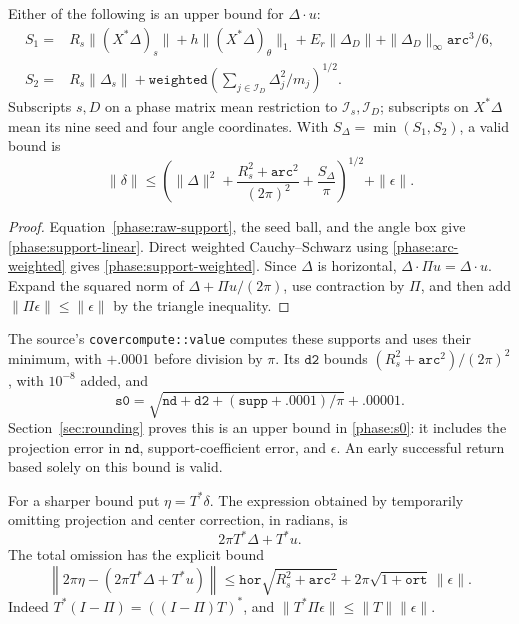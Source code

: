 \begin{lemma}
\label{phase:direct-bound}
Either of the following is an upper bound for \(\Delta\cdot u\):
\begin{align}
 S_1={}&R_s\|(X^*\Delta)_s\|
          +h\|(X^*\Delta)_\theta\|_1
          +E_r\|\Delta_D\|
          +\|\Delta_D\|_\infty\mathtt{arc}^3/6, \label{phase:support-linear}\\
 S_2={}&R_s\|\Delta_s\|
          +\mathtt{weighted}
                  \left(\sum_{j\in\mathcal I_D}\Delta_j^2/m_j\right)^{1/2}.
 \label{phase:support-weighted}
\end{align}
Subscripts \(s,D\) on a phase matrix mean restriction to
\(\mathcal I_s,\mathcal I_D\); subscripts on \(X^*\Delta\) mean its
nine seed and four angle coordinates.  With \(S_\Delta=\min(S_1,S_2)\),
a valid bound is
\begin{equation}
 \|\delta\|\leq
 \left(\|\Delta\|^2+
       \frac{R_s^2+\mathtt{arc}^2}{(2\pi)^2}
       +\frac{S_\Delta}{\pi}\right)^{1/2}
       +\|\epsilon\|.
 \label{phase:s0}
\end{equation}
\end{lemma}

\begin{proof}
Equation~\eqref{phase:raw-support}, the seed ball, and the angle box
give \eqref{phase:support-linear}.  Direct weighted Cauchy--Schwarz
using \eqref{phase:arc-weighted} gives
\eqref{phase:support-weighted}.  Since \(\Delta\) is horizontal,
\(\Delta\cdot\Pi u=\Delta\cdot u\).  Expand the squared norm of
\(\Delta+\Pi u/(2\pi)\), use contraction by \(\Pi\), and then add
\(\|\Pi\epsilon\|\leq\|\epsilon\|\) by the triangle inequality.
\end{proof}

The source's \texttt{covercompute::value} computes these supports and
uses their minimum, with \(+.0001\) before division by \(\pi\).
Its \(\mathtt{d2}\) bounds
\((R_s^2+\mathtt{arc}^2)/(2\pi)^2\), with \(10^{-8}\) added, and
\[
 \mathtt{s0}
   =\sqrt{\mathtt{nd}+\mathtt{d2}
                       +(\mathtt{supp}+.0001)/\pi}+.00001.
\]
Section~\ref{sec:rounding} proves this is an upper bound in
\eqref{phase:s0}: it includes the projection error in
\(\mathtt{nd}\), support-coefficient error, and \(\epsilon\).
An early successful return based solely on this bound is valid.

For a sharper bound put \(\eta=T^*\delta\).  The expression obtained
by temporarily omitting projection and center correction, in radians,
is
\[
 2\pi T^*\Delta+T^*u.
\]
The total omission has the explicit bound
\begin{equation}
 \left\|2\pi\eta-(2\pi T^*\Delta+T^*u)\right\|
 \leq
 \mathtt{hor}\sqrt{R_s^2+\mathtt{arc}^2}
       +2\pi\sqrt{1+\mathtt{ort}}\,\|\epsilon\|.
 \label{phase:tangent-projection-error}
\end{equation}
Indeed \(T^*(I-\Pi)=((I-\Pi)T)^*\), and
\(\|T^*\Pi\epsilon\|\leq\|T\|\|\epsilon\|\).

